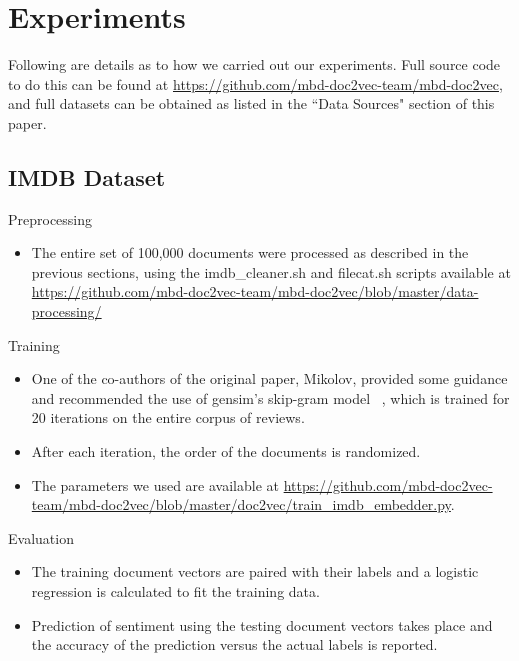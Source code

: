 \documentclass[11pt]{article}
\begin{document}
\section*{Experiments}
Following are details as to how we carried out our experiments.
Full source code to do this can be found at
\url{https://github.com/mbd-doc2vec-team/mbd-doc2vec}, and full datasets
can be obtained as listed in the ``Data Sources" section of this paper.

\subsection*{IMDB Dataset}
\let\oldlabelitemi=\labelitemi
\renewcommand\labelitemi{{\boldmath$\cdot$}}
\begin{description}
  \item Preprocessing
    \begin{itemize}
      \item The entire set of 100,000 documents were processed as described
            in the previous sections, using the imdb\_cleaner.sh and filecat.sh
            scripts available at \url{https://github.com/mbd-doc2vec-team/mbd-doc2vec/blob/master/data-processing/}
    \end{itemize}
  \item Training
    \begin{itemize}
      \item One of the co-authors of the original paper, Mikolov, provided
            some guidance and recommended the use of gensim's skip-gram model
            ~\cite{gensim}, which is trained for 20 iterations on the entire
            corpus of reviews.
      \item After each iteration, the order of the documents is randomized.
      \item The parameters we used are available at \url{https://github.com/mbd-doc2vec-team/mbd-doc2vec/blob/master/doc2vec/train_imdb_embedder.py}.
    \end{itemize}
  \item Evaluation
    \begin{itemize}
      \item The training document vectors are paired with their labels and
            a logistic regression is calculated to fit the training data.
      \item Prediction of sentiment using the testing document vectors takes
            place and the accuracy of the prediction versus the actual labels
            is reported.
    \end{itemize}
\end{description}
\end{document}
